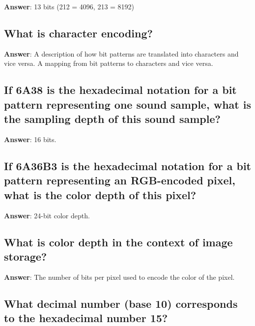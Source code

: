 \documentclass[a4paper,11pt,oneside]{article}
\begin{document}
\begin{sloppypar}
\label{q:67:sa:en:True}

\textbf{Answer}: 13 bits (212 = 4096, 213 = 8192)



\subsection{What is character encoding?}

\label{q:68:sa:en:True}

\textbf{Answer}: A description of how bit patterns are translated into characters and vice versa. A mapping from bit patterns to characters and vice versa.



\subsection{If 6A38 is the hexadecimal notation for a bit pattern representing one sound sample, what is the sampling depth of this sound sample?}

\label{q:71:sa:en:True}

\textbf{Answer}: 16 bits.



\subsection{If 6A36B3 is the hexadecimal notation for a bit pattern representing an RGB-encoded pixel, what is the color depth of this pixel?}

\label{q:72:sa:en:True}

\textbf{Answer}: 24-bit color depth.



\subsection{What is color depth in the context of image storage?}

\label{q:73:sa:en:True}

\textbf{Answer}: The number of bits per pixel used to encode the color of the pixel.



\subsection{What decimal number (base 10) corresponds to the hexadecimal number 15?}

\label{q:74:sa:en:True}


\end{sloppypar}
\end{document}
